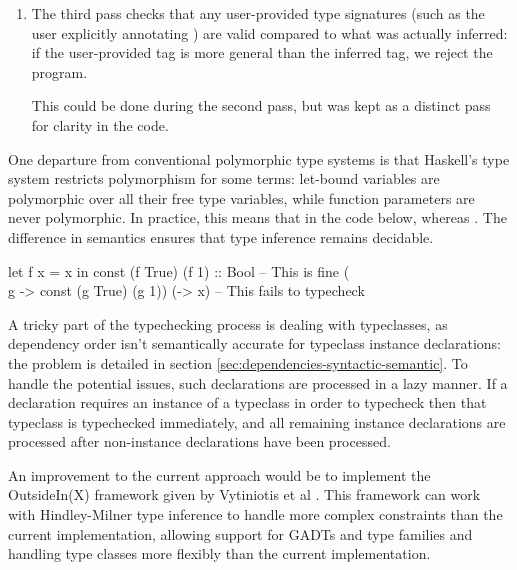 \documentclass[dissertation.tex]{subfiles}
\begin{document}
{{\begin{enumerate}
{        }
        \item
        {

            The third pass checks that any user-provided type signatures (such as the user explicitly annotating
            ) are valid compared to what was actually inferred: if the user-provided tag is more
            general than the inferred tag, we reject the program.

            This could be done during the second pass, but was kept as a distinct pass for clarity in the code.

        }
        \end{enumerate}

        One departure from conventional polymorphic type systems is that Haskell's type system restricts
        polymorphism for some terms: let-bound variables are polymorphic over all their free type variables, while
        function parameters are never polymorphic. In practice, this means that in the code below,  whereas . The
        difference in semantics ensures that type inference remains decidable.

        \begin{haskellfigure}
        let f x = x in const (f True) (f 1) :: Bool -- This is fine
        (\\g -> const (g True) (g 1)) (\x -> x)     -- This fails to typecheck
        \end{haskellfigure}

        A tricky part of the typechecking process is dealing with typeclasses, as dependency order isn't
        semantically accurate for typeclass instance declarations: the problem is detailed in section
        \ref{sec:dependencies-syntactic-semantic}. To handle the potential issues, such declarations are processed
        in a lazy manner. If a declaration requires an instance of a typeclass in order to typecheck then that
        typeclass is typechecked immediately, and all remaining instance declarations are processed after
        non-instance declarations have been processed.

        An improvement to the current approach would be to implement the OutsideIn(X) framework given by Vytiniotis
        et al \cite{OutsideIn}. This framework can work with Hindley-Milner type inference to handle more complex
        constraints than the current implementation, allowing support for GADTs and type families and handling type
        classes more flexibly than the current implementation.

}}
\end{document}
